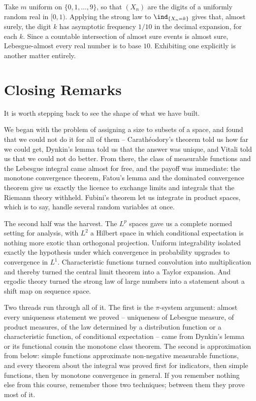 \begin{example}
	Take $m$ uniform on $\{0,1,\dots,9\}$, so that $(X_n)$ are the digits of a uniformly random real in $[0,1)$. Applying the strong law to $\ind_{\{X_n = k\}}$ gives that, almost surely, the digit $k$ has asymptotic frequency $1/10$ in the decimal expansion, for each $k$. Since a countable intersection of almost sure events is almost sure, Lebesgue-almost every real number is  to base $10$. Exhibiting one explicitly is another matter entirely.
\end{example}

\section{Closing Remarks}

It is worth stepping back to see the shape of what we have built.

We began with the problem of assigning a size to subsets of a space, and found that we could not do it for all of them -- Carath\'eodory's theorem told us how far we could get, Dynkin's lemma told us that the answer was unique, and Vitali told us that we could not do better. From there, the class of measurable functions and the Lebesgue integral came almost for free, and the payoff was immediate: the monotone convergence theorem, Fatou's lemma and the dominated convergence theorem give us exactly the licence to exchange limits and integrals that the Riemann theory withheld. Fubini's theorem let us integrate in product spaces, which is to say, handle several random variables at once.

The second half was the harvest. The $L^p$ spaces gave us a complete normed setting for analysis, with $L^2$ a Hilbert space in which conditional expectation is nothing more exotic than orthogonal projection. Uniform integrability isolated exactly the hypothesis under which convergence in probability upgrades to convergence in $L^1$. Characteristic functions turned convolution into multiplication and thereby turned the central limit theorem into a Taylor expansion. And ergodic theory turned the strong law of large numbers into a statement about a shift map on sequence space.

Two threads run through all of it. The first is the $\pi$-system argument: almost every uniqueness statement we proved -- uniqueness of Lebesgue measure, of product measures, of the law determined by a distribution function or a characteristic function, of conditional expectation -- came from Dynkin's lemma or its functional cousin the monotone class theorem. The second is approximation from below: simple functions approximate non-negative measurable functions, and every theorem about the integral was proved first for indicators, then simple functions, then by monotone convergence in general. If you remember nothing else from this course, remember those two techniques; between them they prove most of it.

